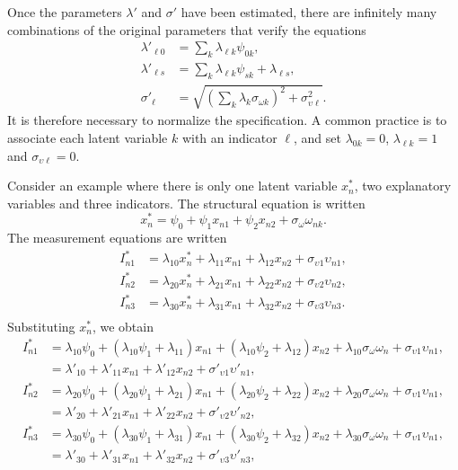 \documentclass[12pt,a4paper]{article}
\begin{document}
Once the parameters $\lambda'$ and $\sigma'$ have been estimated, there are infinitely many combinations of the original parameters that verify the equations
\begin{align*}
  \lambda'_{\ell 0} &=\sum_k \lambda_{\ell k}  \psi_{0k}, \\
  \lambda'_{\ell s} &=\sum_{k} \lambda_{\ell k} \psi_{sk}+\lambda_{\ell s}, \\
  \sigma'_{\ell}&=\sqrt{(\sum_k \lambda_k \sigma_{\omega k})^2+\sigma^2_{\upsilon \ell}}.
\end{align*}
It is therefore necessary to normalize the specification. A common practice is to associate each latent variable $k$ with an indicator $\ell$, and set $\lambda_{0 k} =0$, $\lambda_{\ell k} =1$ and $\sigma_{\upsilon \ell}=0$.

Consider an example where there is only one latent variable $x^*_n$, two explanatory variables and three indicators. The structural equation  is written
\[
x^*_n = \psi_0 + \psi_1 x_{n1} + \psi_2 x_{n2} + \sigma_\omega \omega_{nk}.
\]
The measurement equations  are written
\[
\begin{aligned}
I^*_{n1} &= \lambda_{10}  x_{n}^* + \lambda_{11} x_{n1} + \lambda_{12} x_{n2} + \sigma_{\upsilon 1} \upsilon_{n1}, \\
I^*_{n2} &= \lambda_{20}  x_{n}^* + \lambda_{21} x_{n1} + \lambda_{22} x_{n2} + \sigma_{\upsilon 2} \upsilon_{n2}, \\
I^*_{n3} &= \lambda_{30}  x_{n}^* + \lambda_{31} x_{n1} + \lambda_{32} x_{n2} + \sigma_{\upsilon 3} \upsilon_{n3}. \\
\end{aligned}
\]
Substituting $x^*_n$, we obtain
\[
\begin{aligned}
I^*_{n1} &= \lambda_{10}  \psi_0 + (\lambda_{10}\psi_1 +  \lambda_{11}) x_{n1} + (\lambda_{10}\psi_2+\lambda_{12} ) x_{n2} + \lambda_{10}\sigma_\omega \omega_n + \sigma_{\upsilon 1} \upsilon_{n1}, \\
        &= \lambda'_{10}+ \lambda'_{11} x_{n1} + \lambda'_{12} x_{n2} + \sigma'_{\upsilon 1} \upsilon'_{n1}, \\
I^*_{n2} &= \lambda_{20}  \psi_0 + (\lambda_{20}\psi_1 +  \lambda_{21}) x_{n1} + (\lambda_{20}\psi_2+\lambda_{22} ) x_{n2} + \lambda_{20}\sigma_\omega \omega_n + \sigma_{\upsilon 1} \upsilon_{n1}, \\
        &= \lambda'_{20}+ \lambda'_{21} x_{n1} + \lambda'_{22} x_{n2} + \sigma'_{\upsilon 2} \upsilon'_{n2}, \\
I^*_{n3} &= \lambda_{30}  \psi_0 + (\lambda_{30}\psi_1 +  \lambda_{31}) x_{n1} + (\lambda_{30}\psi_2+\lambda_{32} ) x_{n2} + \lambda_{30}\sigma_\omega \omega_n + \sigma_{\upsilon 1} \upsilon_{n1}, \\
        &= \lambda'_{30}+ \lambda'_{31} x_{n1} + \lambda'_{32} x_{n2} + \sigma'_{\upsilon 3} \upsilon'_{n3}, \\
\end{aligned}
\]
\end{document}
